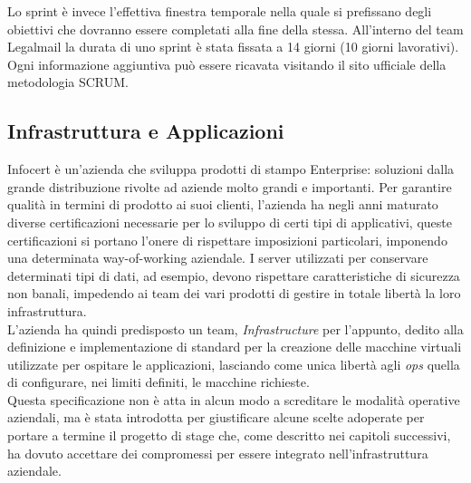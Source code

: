 Lo sprint è invece l'effettiva finestra temporale nella quale si prefissano degli obiettivi che dovranno essere completati alla fine della stessa. All'interno del team Legalmail la durata di uno sprint è stata fissata a 14 giorni (10 giorni lavorativi). \\
Ogni informazione aggiuntiva può essere ricavata visitando il sito ufficiale della metodologia SCRUM. %
\subsection{Infrastruttura e Applicazioni}
\label{subsec:infra}
Infocert è un'azienda che sviluppa prodotti di stampo Enterprise: soluzioni dalla grande distribuzione rivolte ad aziende molto grandi e importanti. Per garantire qualità in termini di prodotto ai suoi clienti, l'azienda ha negli anni maturato diverse certificazioni necessarie per lo sviluppo di certi tipi di applicativi, queste certificazioni si portano l'onere di rispettare imposizioni particolari, imponendo una determinata \gls{way-of-working} aziendale.
I server utilizzati per conservare determinati tipi di dati, ad esempio, devono rispettare caratteristiche di sicurezza non banali, impedendo ai team dei vari prodotti di gestire in totale libertà la loro infrastruttura. \\
L'azienda ha quindi predisposto un team, \textit{Infrastructure} per l'appunto, dedito alla definizione e implementazione di standard per la creazione delle macchine virtuali utilizzate per ospitare le applicazioni, lasciando come unica libertà agli \textit{ops} quella di configurare, nei limiti definiti, le macchine richieste. \\
Questa specificazione non è atta in alcun modo a screditare le modalità operative aziendali, ma è stata introdotta per giustificare alcune scelte adoperate per portare a termine il progetto di stage che, come descritto nei capitoli successivi, ha dovuto accettare dei compromessi per essere integrato nell'infrastruttura aziendale.
